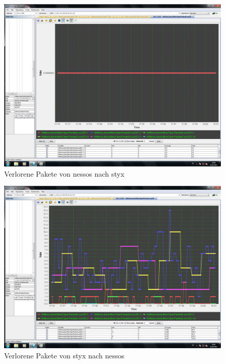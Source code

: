 \documentclass[a4paper,10pt]{scrartcl}
\begin{document}
\begin{figure}[h]
 \centering
 \includegraphics[width=\textwidth]{./Bilder/C/packet-loss-ds.png}
 \caption{Verlorene Pakete von nessos nach styx}
\end{figure}

\begin{figure}[h]
 \centering
 \includegraphics[width=\textwidth]{./Bilder/C/packet-loss-sd.png}
 \caption{Verlorene Pakete von styx nach nessos}
\end{figure}
\end{document}
